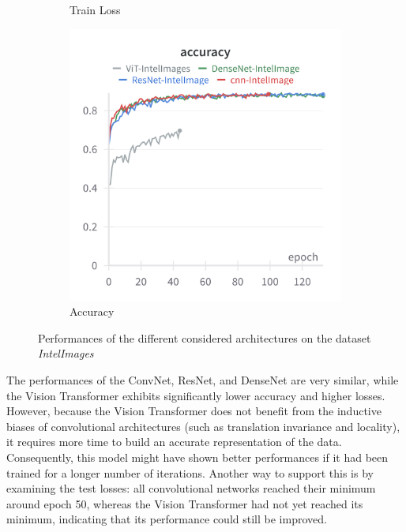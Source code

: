 \documentclass[twocolumn,superscriptaddress,aps]{revtex4-1}
\begin{document}
\begin{figure}[H]
\begin{subfigure}{0.235 \textwidth}
        \caption{Train Loss}
    \end{subfigure}
    \begin{subfigure}{0.35 \textwidth}
        \includegraphics[width = 0.99 \textwidth]{images/IntelImage_accuracy.png}
        \caption{Accuracy}
    \end{subfigure}
    
    \caption{Performances of the different considered architectures on the dataset \textit{IntelImages}}
    \label{fig:intel}
\end{figure}

The performances of the ConvNet, ResNet, and DenseNet are very similar, while the Vision Transformer exhibits significantly lower accuracy and higher losses. However, because the Vision Transformer does not benefit from the inductive biases of convolutional architectures (such as translation invariance and locality), it requires more time to build an accurate representation of the data. Consequently, this model might have shown better performances if it had been trained for a longer number of iterations. Another way to support this is by examining the test losses: all convolutional networks reached their minimum around epoch 50, whereas the Vision Transformer had not yet reached its minimum, indicating that its performance could still be improved.\\
\end{document}
